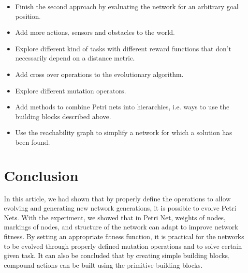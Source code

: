 \documentclass[12pt,a4paper,twocolumn]{article}
\begin{document}
\begin{itemize}
\item Finish the second approach by evaluating the network for an arbitrary goal position.
\item Add more actions, sensors and obstacles to the world.
\item Explore different kind of tasks with different reward functions that don't necessarily depend on a distance metric.
\item Add cross over operations to the evolutionary algorithm.
\item Explore different mutation operators.
\item Add methods to combine Petri nets into hierarchies, i.e. ways to use the building blocks described above.
\item Use the reachability graph to simplify a network for which a solution has been found.
\end{itemize}

\section{Conclusion}

In this article, we had shown that by properly define the operations to allow evolving and generating new network generations, it is possible to evolve Petri Nets. With the experiment, we showed that in Petri Net, weights of nodes, markings of nodes, and structure of the network can adapt to improve network fitness. By setting an appropriate fitness function, it is practical for the networks to be evolved through properly defined mutation operations and to solve certain given task. It can also be concluded that by creating simple building blocks, compound actions can be built using the primitive building blocks. 



\end{document}
